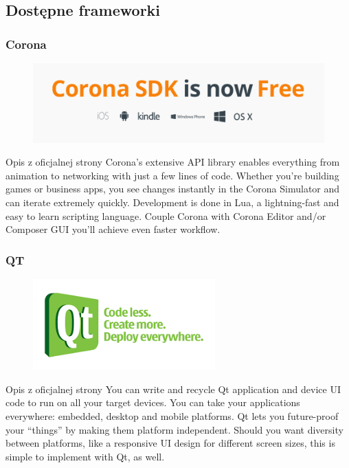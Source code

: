 \documentclass{beamer}
\begin{document}
\subsection{Dostępne frameworki}
\begin{frame}
\frametitle{Corona}
\begin{figure}
 \includegraphics[width=12cm,valign=t]{corona.png}
 \end{figure}
 \begin{block}{Opis z oficjalnej strony }
Corona's extensive API library enables everything from animation to networking with just a few lines of code. Whether you're building games or business apps, you see changes instantly in the Corona Simulator and can iterate extremely quickly. Development is done in Lua, a lightning-fast and easy to learn scripting language. Couple Corona with Corona Editor and/or Composer GUI you'll achieve even faster workflow. 
 \end{block}
\end{frame}

\begin{frame}
\frametitle{QT}
\begin{figure}
 \includegraphics[width=7cm,valign=t]{qt.png}
 \end{figure}
 \begin{block}{Opis z oficjalnej strony }
You can write and recycle Qt application and device UI code to run on all your target devices. You can take your applications everywhere: embedded, desktop and mobile platforms. Qt lets you future-proof your “things” by making them platform independent. Should you want diversity between platforms, like a responsive UI design for different screen sizes, this is simple to implement with Qt, as well.
 \end{block}
\end{frame}
\end{document}
